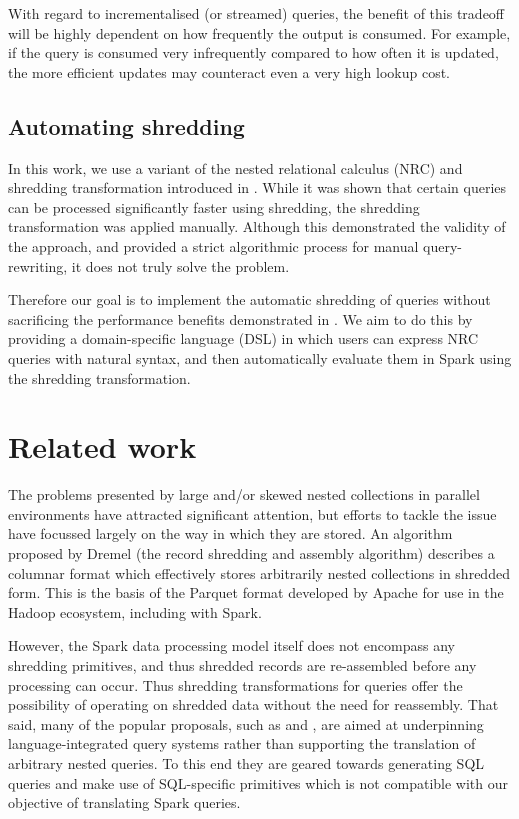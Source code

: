 {With regard to incrementalised (or streamed) queries, the benefit of this tradeoff will be highly dependent on how frequently the output is consumed. For example, if the query is consumed very infrequently compared to how often it is updated, the more efficient updates may counteract even a very high lookup cost.

\subsection{Automating shredding} {
In this work, we use a variant of the nested relational calculus (NRC) and shredding transformation introduced in \cite{draftpaper}. While it was shown that certain queries can be processed significantly faster using shredding, the shredding transformation was applied manually. Although this demonstrated the validity of the approach, and provided a strict algorithmic process for manual query-rewriting, it does not truly solve the problem.

Therefore our goal is to implement the automatic shredding of queries without sacrificing the performance benefits demonstrated in \cite{draftpaper}. We aim to do this by providing a domain-specific language (DSL) in which users can express NRC queries with natural syntax, and then automatically evaluate them in Spark using the shredding transformation.
}

\section{Related work} {
The problems presented by large and/or skewed nested collections in parallel environments have attracted significant attention, but efforts to tackle the issue have focussed largely on the way in which they are stored. An algorithm proposed by Dremel \cite{melnik2010dremel} (the record shredding and assembly algorithm) describes a columnar format which effectively stores arbitrarily nested collections in shredded form. This is the basis of the Parquet format \cite{parquet} developed by Apache for use in the Hadoop ecosystem, including with Spark.

However, the Spark data processing model itself does not encompass any shredding primitives, and thus shredded records are re-assembled before any processing can occur. Thus shredding transformations for queries offer the possibility of operating on shredded data without the need for reassembly. That said, many of the popular proposals, such as \cite{grust2009ferry} and \cite{lindley2012row}, are aimed at underpinning language-integrated query systems rather than supporting the translation of arbitrary nested queries. To this end they are geared towards generating SQL queries and make use of SQL-specific primitives which is not compatible with our objective of translating Spark queries.

}}
